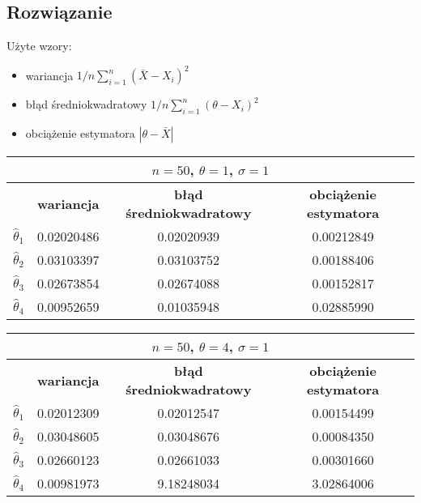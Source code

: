 \documentclass[a4paper]{article}
\begin{document}
\subsection{Rozwiązanie}
Użyte wzory:
\begin{itemize}
\item wariancja $1/n\sum_{i=1}^n(\bar{X}-X_i)^2$
\item błąd średniokwadratowy $1/n\sum_{i=1}^n(\theta-X_i)^2$
\item obciążenie estymatora $|\theta - \bar{X}|$
\end{itemize}

\begin{table}[H]
\centering
\begin{tabular}{|c|c|c|c|}
\hline
\multicolumn{4}{|c|}{$n=50$, $\theta=1$, $\sigma=1$} \\ \hline
                  & \textbf{wariancja}   & \textbf{błąd średniokwadratowy} & \textbf{obciążenie estymatora} \\ \hline
$\hat{\theta}_1$ & 0.02020486 & 0.02020939 & 0.00212849 \\ \hline
$\hat{\theta}_2$ & 0.03103397 & 0.03103752 & 0.00188406 \\ \hline
$\hat{\theta}_3$ & 0.02673854 & 0.02674088 & 0.00152817 \\ \hline
$\hat{\theta}_4$ & 0.00952659 & 0.01035948 & 0.02885990 \\ \hline
\end{tabular}
\end{table}


\begin{table}[H]
\centering
\begin{tabular}{|c|c|c|c|}
\hline
\multicolumn{4}{|c|}{$n=50$, $\theta=4$, $\sigma=1$} \\ \hline
                  & \textbf{wariancja}   & \textbf{błąd średniokwadratowy} & \textbf{obciążenie estymatora} \\ \hline
$\hat{\theta}_1$ & 0.02012309 & 0.02012547 & 0.00154499 \\ \hline
$\hat{\theta}_2$ & 0.03048605 & 0.03048676 & 0.00084350 \\ \hline
$\hat{\theta}_3$ & 0.02660123 & 0.02661033 & 0.00301660 \\ \hline
$\hat{\theta}_4$ & 0.00981973 & 9.18248034 & 3.02864006 \\ \hline
\end{tabular}
\end{table}
\end{document}
